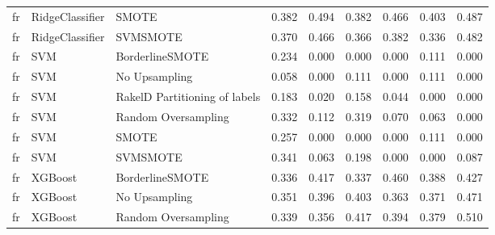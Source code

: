 \begin{tabular}{lllllllll}
      fr &                 RidgeClassifier &                         SMOTE & 0.382 &                     0.494 &                 0.382 &                  0.466 &                                   0.403 &     0.487 \\
      fr &                 RidgeClassifier &                      SVMSMOTE & 0.370 &                     0.466 &                 0.366 &                  0.382 &                                   0.336 &     0.482 \\
      fr &                             SVM &               BorderlineSMOTE & 0.234 &                     0.000 &                 0.000 &                  0.000 &                                   0.111 &     0.000 \\
      fr &                             SVM &                 No Upsampling & 0.058 &                     0.000 &                 0.111 &                  0.000 &                                   0.111 &     0.000 \\
      fr &                             SVM & RakelD Partitioning of labels & 0.183 &                     0.020 &                 0.158 &                  0.044 &                                   0.000 &     0.000 \\
      fr &                             SVM &           Random Oversampling & 0.332 &                     0.112 &                 0.319 &                  0.070 &                                   0.063 &     0.000 \\
      fr &                             SVM &                         SMOTE & 0.257 &                     0.000 &                 0.000 &                  0.000 &                                   0.111 &     0.000 \\
      fr &                             SVM &                      SVMSMOTE & 0.341 &                     0.063 &                 0.198 &                  0.000 &                                   0.000 &     0.087 \\
      fr &                         XGBoost &               BorderlineSMOTE & 0.336 &                     0.417 &                 0.337 &                  0.460 &                                   0.388 &     0.427 \\
      fr &                         XGBoost &                 No Upsampling & 0.351 &                     0.396 &                 0.403 &                  0.363 &                                   0.371 &     0.471 \\
      fr &                         XGBoost &           Random Oversampling & 0.339 &                     0.356 &                 0.417 &                  0.394 &                                   0.379 &     0.510 \\

\end{tabular}
